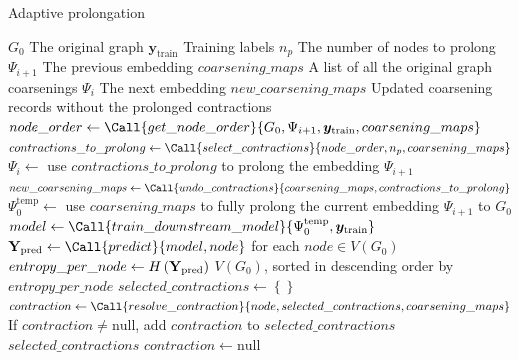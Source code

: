 \begin{algorithm*}
  \caption{Adaptive prolongation}
  \label{alg:adaptive-prolongation}
  \begin{algorithmic}
    \Require $ G_0 $ \Comment The original graph
    \Require $ \bm{y}_\mathrm{train} $ \Comment Training labels
    \Require $ n_p $ \Comment The number of nodes to prolong
    \Require $ \Psi_{i + 1} $ \Comment The previous embedding
    \Require $ coarsening\_maps $ \Comment A list of all the original graph coarsenings
    \Ensure $ \Psi_i $ \Comment The next embedding
    \Ensure $ new\_coarsening\_maps $ \Comment Updated coarsening records without the prolonged contractions
    \Statex
    \State $ node\_order \gets \Call{get\_node\_order}{G_0, \Psi_{i+1}, \bm{y}_\mathrm{train}, coarsening\_maps} $
    \State $ contractions\_to\_prolong \gets \Call{select\_contractions}{node\_order, n_p, coarsening\_maps} $
    \State $ \Psi_i \gets $ use $ contractions\_to\_prolong $ to prolong the embedding $ \Psi_{i + 1} $
    \State $ new\_coarsening\_maps \gets \Call{undo\_contractions}{coarsening\_maps, contractions\_to\_prolong} $
    \Statex
        \State $ \Psi_0^\mathrm{temp} \gets $ use $ coarsening\_maps $ to fully prolong the current embedding $ \Psi_{i+1} $ to $ G_0 $
        \State $ model \gets \Call{train\_downstream\_model}{\Psi_0^\mathrm{temp}, \bm{y}_\mathrm{train}} $
        \State $ \mathmat{Y}_\mathrm{pred} \gets \Call{predict}{model, node} $ for each $ node \in V \left( G_0 \right) $
        \State $ entropy\_per\_node \gets H \left( \mathbf{Y}_\mathrm{pred} \right) $
        \State \Return $ V \left( G_0 \right) $, sorted in descending order by $ entropy\_per\_node $
    \EndFunction
    \Statex
        \State $ selected\_contractions \gets \left\{ \right\} $
            \State $ contraction \gets \Call{resolve\_contraction}{node, selected\_contractions, coarsening\_maps} $
            \State If $ contraction \neq \mathrm{null} $, add $ contraction $ to $ selected\_contractions $
        \EndFor
        \State \Return $ selected\_contractions $
    \EndFunction
    \Statex
        \State $ contraction \gets \mathrm{null} $

\end{algorithmic}
\end{algorithm*}
